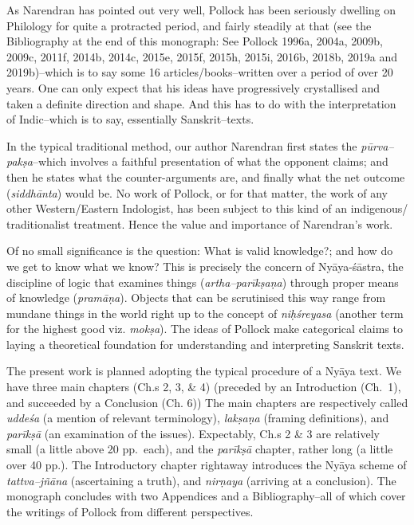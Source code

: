 As Narendran has pointed out very well, Pollock has been seriously dwelling on Philology for quite a protracted period, and fairly steadily at that (see the Bibliography at the end of this monograph: See Pollock 1996a, 2004a, 2009b, 2009c, 2011f, 2014b, 2014c, 2015e, 2015f, 2015h, 2015i, 2016b, 2018b, 2019a and 2019b)–which is to say some 16 articles/books–written over a period of over 20 years. One can only expect that his ideas have progressively crystallised and taken a definite direction and shape. And this has to do with the interpretation of Indic–which is to say, essentially Sanskrit–texts.

In the typical traditional method, our author Narendran first states the \textit{pūrva–pakṣa}–which involves a faithful presentation of what the opponent claims; and then he states what the counter-arguments are, and finally what the net outcome (\textit{siddhānta}) would be. No work of Pollock, or for that matter, the work of any other Western/Eastern Indologist, has been subject to this kind of an indigenous/ traditionalist treatment. Hence the value and importance of Narendran’s work.

Of no small significance is the question: What is valid knowledge?; and how do we get to know what we know? This is precisely the concern of Nyāya-śāstra, the discipline of logic that examines things (\textit{artha–parīkṣaṇa}) through proper means of knowledge (\textit{pramāṇa}). Objects that can be scrutinised this way range from mundane things in the world right up to the concept of \textit{niḥśreyasa} (another term for the highest good viz. \textit{mokṣa}). The ideas of Pollock make categorical claims to laying a theoretical foundation for understanding and interpreting Sanskrit texts.

The present work is planned adopting the typical procedure of a Nyāya text. We have three main chapters (Ch.s 2, 3, \& 4) (preceded by an Introduction (Ch.~1), and succeeded by a Conclusion (Ch. 6)) The main chapters are respectively called \textit{uddeśa} (a mention of relevant terminology), \textit{lakṣaṇa} (framing definitions), and \textit{parīkṣā} (an examination of the issues). Expectably, Ch.s 2 \& 3 are relatively small (a little above 20 pp.~each), and the \textit{parīkṣā} chapter, rather long (a little over 40 pp.). The Introductory chapter rightaway introduces the Nyāya scheme of \textit{tattva–jñāna} (ascertaining a truth), and \textit{nirṇaya} (arriving at a conclusion). The monograph concludes with two Appendices and a Bibliography–all of which cover the writings of Pollock from different perspectives.

